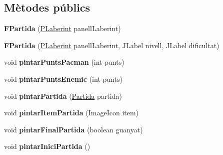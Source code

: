 \subsection*{Mètodes públics}
\begin{DoxyCompactItemize}
\item 
\hypertarget{classinterficie_1_1_f_partida_a6a73b8e78316fc26503ae3aaa9b1c646}{{\bfseries F\+Partida} (\hyperlink{classinterficie_1_1_p_laberint}{P\+Laberint} panell\+Laberint)}\label{classinterficie_1_1_f_partida_a6a73b8e78316fc26503ae3aaa9b1c646}

\item 
\hypertarget{classinterficie_1_1_f_partida_aa7a3a86dd6b54f400238ba43f57cee10}{{\bfseries F\+Partida} (\hyperlink{classinterficie_1_1_p_laberint}{P\+Laberint} panell\+Laberint, J\+Label nivell, J\+Label dificultat)}\label{classinterficie_1_1_f_partida_aa7a3a86dd6b54f400238ba43f57cee10}

\item 
\hypertarget{classinterficie_1_1_f_partida_a2c19bf5a13e39dc3d48a87e121dd06db}{void {\bfseries pintar\+Punts\+Pacman} (int punts)}\label{classinterficie_1_1_f_partida_a2c19bf5a13e39dc3d48a87e121dd06db}

\item 
\hypertarget{classinterficie_1_1_f_partida_a5870ca61ba76baa48d77d57a8f063620}{void {\bfseries pintar\+Punts\+Enemic} (int punts)}\label{classinterficie_1_1_f_partida_a5870ca61ba76baa48d77d57a8f063620}

\item 
\hypertarget{classinterficie_1_1_f_partida_a52a4180cde3f2bd80e9bb635adca414c}{void {\bfseries pintar\+Partida} (\hyperlink{classlogica_1_1_partida}{Partida} partida)}\label{classinterficie_1_1_f_partida_a52a4180cde3f2bd80e9bb635adca414c}

\item 
\hypertarget{classinterficie_1_1_f_partida_a1430adb814777320b1d9f4860b717aae}{void {\bfseries pintar\+Item\+Partida} (Image\+Icon item)}\label{classinterficie_1_1_f_partida_a1430adb814777320b1d9f4860b717aae}

\item 
\hypertarget{classinterficie_1_1_f_partida_a3dc12aac71794744a5de495501af6281}{void {\bfseries pintar\+Final\+Partida} (boolean guanyat)}\label{classinterficie_1_1_f_partida_a3dc12aac71794744a5de495501af6281}

\item 
\hypertarget{classinterficie_1_1_f_partida_a38b42acd1d5586b0ae1472745ffb9d8b}{void {\bfseries pintar\+Inici\+Partida} ()}\label{classinterficie_1_1_f_partida_a38b42acd1d5586b0ae1472745ffb9d8b}


\end{DoxyCompactItemize}
